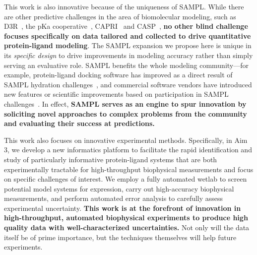 \documentclass[11pt]{article}
\begin{document}



This work is also innovative because of the uniqueness of SAMPL.
While there are other predictive challenges in the area of biomolecular modeling, such as D3R~\cite{gathiaka_d3r_2016}, the pKa cooperative~\cite{Nielsen:2011:Proteins}, CAPRI~\cite{Janin:2005:ProteinScience} and CASP~\cite{Moult:2014:Proteins},
\textbf{no other blind challenge focuses specifically on data tailored and collected to drive quantitative protein-ligand modeling}.
The SAMPL expansion we propose here is unique in its \emph{specific design} to drive improvements in modeling accuracy rather than simply serving an evaluative role.
SAMPL benefits the whole modeling community---for example, protein-ligand docking software has improved as a direct result of SAMPL hydration challenges~\cite{coleman_sampl4_2014}, and commercial software vendors have introduced new features or scientific improvements based on participation in SAMPL challenges~\cite{reinisch_prediction_2012, klamt_prediction_2016}.
In effect, {\bf SAMPL serves as an engine to spur innovation by soliciting novel approaches to complex problems from the community and evaluating their success at predictions.}
 

This work also focuses on innovative experimental methods.
Specifically, in Aim 3, we develop a new informatics platform to facilitate the rapid identification and study of particularly informative protein-ligand systems that are both experimentally tractable for high-throughput biophysical measurements and focus on specific challenges of interest.
We employ a fully automated wetlab to screen potential model systems for expression, carry out high-accuracy biophysical measurements, and perform automated error analysis to carefully assess experimental uncertainty.
\textbf{This work is at the forefront of innovation in high-throughput, automated biophysical experiments to produce high quality data with well-characterized uncertainties.} 
Not only will the data itself be of prime importance, but the techniques themselves will help future experiments.
\end{document}
